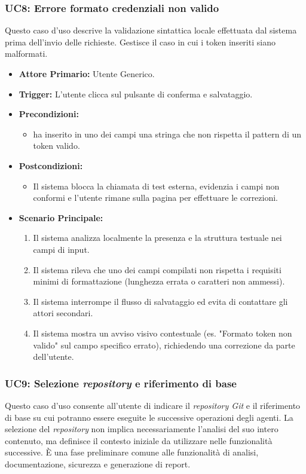 \documentclass[12pt, a4paper]{article}
\begin{document}
\subsubsection{UC8: Errore formato credenziali non valido}\label{uc:8}
Questo caso d'uso descrive la validazione sintattica locale effettuata dal sistema prima dell'invio delle richieste. Gestisce il caso in cui i token inseriti siano malformati.
\begin{itemize}
    \item \textbf{Attore Primario:} Utente Generico.
    \item \textbf{Trigger:} L'utente clicca sul pulsante di conferma e salvataggio.
    \item \textbf{Precondizioni:}\begin{itemize}\item ha inserito in uno dei campi una stringa che non rispetta il pattern di un token valido.\end{itemize}
    \item \textbf{Postcondizioni:}\begin{itemize}\item Il sistema blocca la chiamata di test esterna, evidenzia i campi non conformi e l'utente rimane sulla pagina per effettuare le correzioni.\end{itemize}
    \item \textbf{Scenario Principale:}
    \begin{enumerate}
        \item Il sistema analizza localmente la presenza e la struttura testuale nei campi di input.
        \item Il sistema rileva che uno dei campi compilati non rispetta i requisiti minimi di formattazione (lunghezza errata o caratteri non ammessi).
        \item Il sistema interrompe il flusso di salvataggio ed evita di contattare gli attori secondari.
        \item Il sistema mostra un avviso visivo contestuale (es. "Formato token non valido" sul campo specifico errato), richiedendo una correzione da parte dell'utente.
    \end{enumerate}
\end{itemize}

\newpage

\subsubsection{UC9: Selezione \textit{repository} e riferimento di base}\label{uc:9}
Questo caso d'uso consente all'utente di indicare il \textit{repository Git} e il riferimento di base su cui potranno essere eseguite le successive operazioni degli agenti. La selezione del \textit{repository} non implica necessariamente l'analisi del suo intero contenuto, ma definisce il contesto iniziale da utilizzare nelle funzionalità successive. È una fase preliminare comune alle funzionalità di analisi, documentazione, sicurezza e generazione di report.
\end{document}
